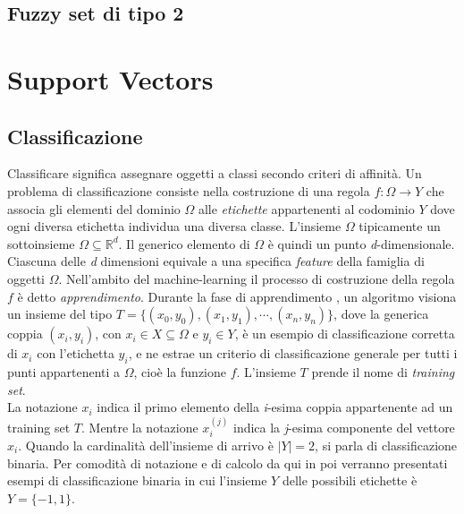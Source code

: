 \documentclass [11pt,a4paper,twoside,openright] {book}
\begin{document}
\section{Fuzzy set di tipo 2}

\chapter{Support Vectors}
\section{Classificazione}
Classificare significa assegnare oggetti a classi secondo criteri di affinità. Un problema di classificazione consiste nella costruzione di una regola $f: \Omega \rightarrow Y$ che associa gli elementi del dominio $\Omega$ alle \textit{etichette} appartenenti al codominio $Y$ dove ogni diversa etichetta individua una diversa classe. L'insieme $\Omega$ tipicamente un sottoinsieme $\Omega \subseteq \mathbb{R}^d$. Il generico elemento di $\Omega$ è quindi un punto \textit{d}-dimensionale. Ciascuna delle \textit{d} dimensioni equivale a una specifica \textit{feature} della famiglia di oggetti $\Omega$. Nell'ambito del machine-learning il processo di costruzione della regola $f$ è detto \textit{apprendimento}. Durante la fase di apprendimento , un algoritmo visiona un insieme del tipo $T=\lbrace (x_0,y_0), (x_1,y_1), \cdots, (x_n,y_n) \rbrace$, dove la generica coppia $(x_i,y_i)$, con $x_i \in X \subseteq \Omega$ e $y_i \in Y$, è un esempio di classificazione corretta di $x_i$ con l'etichetta $y_i$, e ne estrae un criterio di classificazione generale per tutti i punti appartenenti a $\Omega$, cioè la funzione $f$. L'insieme $T$ prende il nome di \textit{training set}.\\
La notazione $x_i$ indica il primo elemento della \textit{i}-esima coppia appartenente ad un training set $T$. Mentre la notazione $x_{i}^{(j)}$ indica la \textit{j}-esima componente del vettore $x_i$. Quando la cardinalità dell'insieme di arrivo è $|Y|=2$, si parla di classificazione binaria. Per comodità di notazione e di calcolo da qui in poi verranno presentati esempi di classificazione binaria in cui l'insieme $Y$ delle possibili etichette è $Y=\lbrace-1,1\rbrace$.
\end{document}

